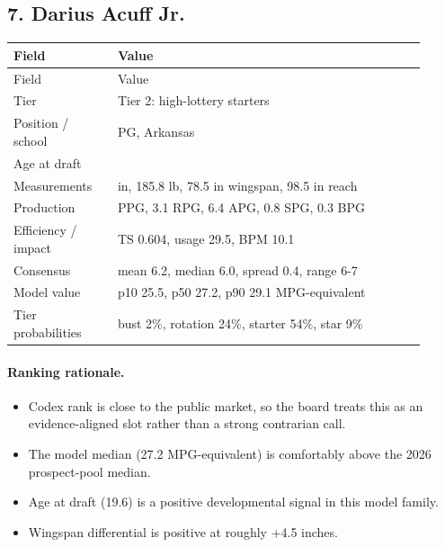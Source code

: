 \documentclass[11pt]{article}
\begin{document}
\subsection{7. Darius Acuff Jr.}
\begin{center}
\scriptsize
\begin{longtable}{@{}>{\raggedright\arraybackslash}p{0.230\linewidth}>{\raggedright\arraybackslash}p{0.680\linewidth}@{}}
\toprule
Field & Value \\
\midrule
\endfirsthead
\toprule
Field & Value \\
\midrule
\endhead
Tier & Tier 2: high-lottery starters \\
Position / school & PG, Arkansas \\
Age at draft & 19.6 \\
Measurements & 74.0 in, 185.8 lb, 78.5 in wingspan, 98.5 in reach \\
Production & 23.5 PPG, 3.1 RPG, 6.4 APG, 0.8 SPG, 0.3 BPG \\
Efficiency / impact & TS 0.604, usage 29.5, BPM 10.1 \\
Consensus & mean 6.2, median 6.0, spread 0.4, range 6-7 \\
Model value & p10 25.5, p50 27.2, p90 29.1 MPG-equivalent \\
Tier probabilities & bust 2\%, rotation 24\%, starter 54\%, star 9\% \\
\bottomrule
\end{longtable}
\end{center}

\paragraph{Ranking rationale.}
\begin{itemize}[leftmargin=*]
\item Codex rank is close to the public market, so the board treats this as an evidence-aligned slot rather than a strong contrarian call.
\item The model median (27.2 MPG-equivalent) is comfortably above the 2026 prospect-pool median.
\item Age at draft (19.6) is a positive developmental signal in this model family.
\item Wingspan differential is positive at roughly +4.5 inches.
\end{itemize}
\end{document}
